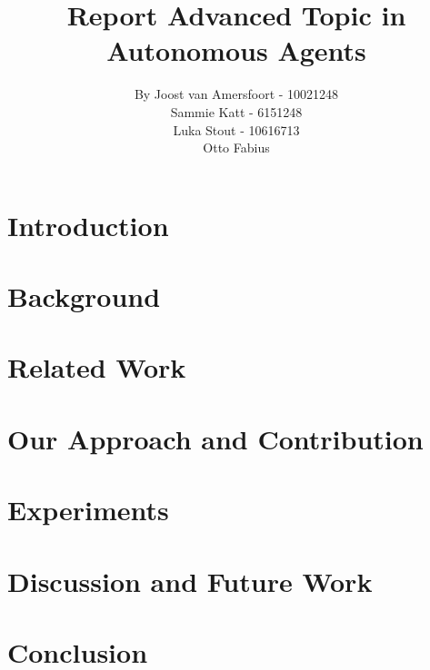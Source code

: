 \documentclass{article}
\title{Report Advanced Topic in Autonomous Agents}
\author{By Joost van Amersfoort - 10021248 \\ Sammie Katt - 6151248 \\ Luka Stout - 10616713 \\ Otto Fabius}
\begin{document}
\maketitle
\tableofcontents
\newpage

\section{Introduction}


\section{Background}


\section{Related Work}


\section{Our Approach and Contribution}


\section{Experiments}


\section{Discussion and Future Work}


\section{Conclusion}

\end{document}
